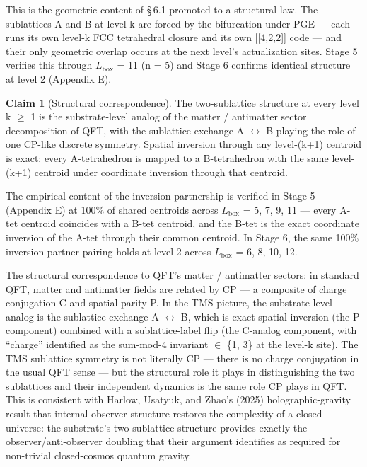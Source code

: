 \documentclass[11pt,oneside]{report}
\theoremstyle{definition}
\newtheorem{claim}[theorem]{Claim}
\theoremstyle{remark}
\begin{document}
This is the geometric content of \S\,6.1 promoted to a structural law. The
sublattices A and B at level k are forced by the bifurcation under PGE
--- each runs its own level-k FCC tetrahedral closure and its own
[[4,2,2]] code --- and their only geometric overlap occurs at
the next level's actualization sites. Stage 5 verifies this through
\ensuremath{L_{\mathrm{box}}} = 11 (n = 5) and Stage 6 confirms identical structure at level 2
(Appendix E).

\begin{claim}[Structural correspondence]
The two-sublattice
structure at every level k \ensuremath{\geq} 1 is the substrate-level analog of the
matter / antimatter sector decomposition of QFT, with the sublattice
exchange A \ensuremath{\leftrightarrow} B playing the role of one CP-like discrete symmetry.
Spatial inversion through any level-(k+1) centroid is exact: every
A-tetrahedron is mapped to a B-tetrahedron with the same level-(k+1)
centroid under coordinate inversion through that centroid.
\end{claim}

The empirical content of the inversion-partnership is verified in Stage
5 (Appendix E) at 100\% of shared centroids across \ensuremath{L_{\mathrm{box}}} = 5, 7, 9, 11
--- every A-tet centroid coincides with a B-tet centroid, and the B-tet
is the exact coordinate inversion of the A-tet through their common
centroid. In Stage 6, the same 100\% inversion-partner pairing holds at
level 2 across \ensuremath{L_{\mathrm{box}}} = 6, 8, 10, 12.

The structural correspondence to QFT's matter / antimatter sectors: in
standard QFT, matter and antimatter fields are related by CP --- a
composite of charge conjugation C and spatial parity P. In the TMS
picture, the substrate-level analog is the sublattice exchange A \ensuremath{\leftrightarrow} B,
which is exact spatial inversion (the P component) combined with a
sublattice-label flip (the C-analog component, with ``charge''
identified as the sum-mod-4 invariant \ensuremath{\in} \{1, 3\} at the level-k site).
The TMS sublattice symmetry is not literally CP --- there is no charge
conjugation in the usual QFT sense --- but the structural role it plays
in distinguishing the two sublattices and their independent dynamics is
the same role CP plays in QFT. This is consistent with Harlow, Usatyuk,
and Zhao's (2025) holographic-gravity result that internal observer
structure restores the complexity of a closed universe: the substrate's
two-sublattice structure provides exactly the observer/anti-observer
doubling that their argument identifies as required for non-trivial
closed-cosmos quantum gravity.
\end{document}
